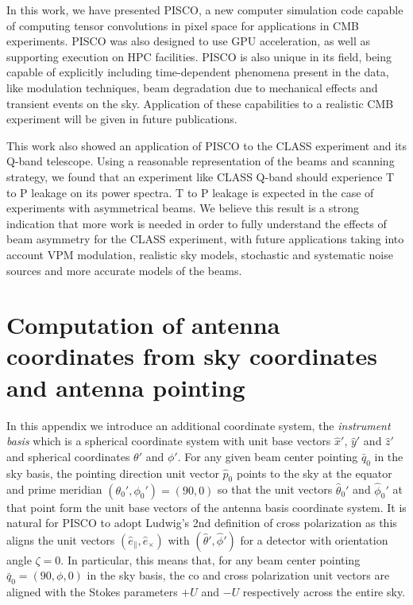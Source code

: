 \documentclass[a4paper,fleqn]{cas-dc}\sloppy
\newcommand{\co}{\mathbin{\|}}
\newcommand{\cx}{\mathbin{\times}}
\begin{document}
	In this work, we have presented PISCO, a new computer simulation code capable of computing tensor convolutions in pixel space for applications in CMB experiments. PISCO was also designed to use GPU acceleration, as well as supporting execution on HPC facilities. PISCO is also unique in its field, being capable of explicitly including time-dependent phenomena present in the data, like modulation techniques, beam degradation due to mechanical effects and transient events on the sky. Application of these capabilities to a realistic CMB experiment will be given in future publications.
	
	This work also showed an application of PISCO to the CLASS experiment and its Q-band telescope. Using a reasonable representation of the beams and scanning strategy, we found that an experiment like CLASS Q-band should experience T to P leakage on its power spectra. T to P leakage is expected in the case of experiments with asymmetrical beams. We believe this result is a strong indication that more work is needed in order to fully understand the effects of beam asymmetry for the CLASS experiment, with future applications taking into account VPM modulation, realistic sky models, stochastic and systematic noise sources and more accurate models of the beams.
	
	
	
	

	\appendix
	\section{Computation of antenna coordinates from sky coordinates and antenna pointing}
	
	In this appendix we introduce an additional coordinate system, the \textsl{instrument basis} which is a spherical coordinate system with unit base vectors $\hat{x}'$, $\hat{y}'$ and $\hat{z}'$ and spherical coordinates $\theta'$ and $\phi'$. For any given beam center pointing $\bar{q}_0$ in the sky basis, the pointing direction unit vector $\hat{p}_0$ points to the sky at the equator and prime meridian $(\theta_0',\phi_0') = (90,0)$ so that the unit vectors $\hat{\theta}_0'$ and $\hat{\phi}_0'$ at that point form the unit base vectors of the antenna basis coordinate system. It is natural for PISCO to adopt Ludwig's 2nd definition of cross polarization \cite{1140406} as this aligns the unit vectors $(\hat{e}_{\co},\hat{e}_{\cx})$ with $(\hat{\theta}',\hat{\phi}')$ for a detector with orientation angle $\zeta = 0$. In particular, this means that, for any beam center pointing $\bar{q}_0 = (90,\phi,0)$ in the sky basis, the co and cross polarization unit vectors are aligned with the Stokes parameters $+U$ and $-U$ respectively across the entire sky.
	
\end{document}
